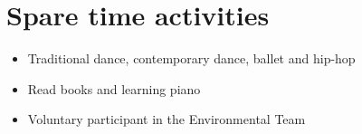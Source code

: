 \documentclass[letterpaper]{engineer_cv} %
\begin{document}
	\section{Spare time activities}

	\begin{longList} %
		\longListItem
			{}
			{}
			{}
			{\begin{itemize}
			  \item Traditional dance, contemporary dance, ballet and hip-hop
			  \item Read books and learning piano
              \item Voluntary participant in the Environmental Team
			\end{itemize}}
			{}
			{}
			\\
	\end{longList}

	\raggedleft{\today}
\end{document}
